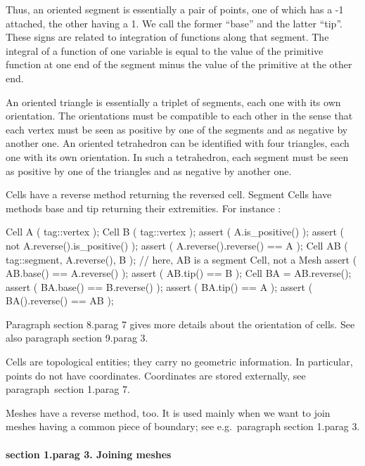 Thus, an oriented segment is essentially a pair of points, one of which has a \hbox{-1}
attached, the other having a 1.
We call the former ``base'' and the latter ``tip''.
These signs are related to integration of functions along that segment.
The integral of a function of one variable is equal to the value of the 
primitive function at one end of the segment minus the value of the primitive at the other end.

An oriented triangle is essentially a triplet of segments, each one with its own orientation.
The orientations must be compatible to each other in the sense that each vertex 
must be seen as positive by one of the segments and as negative by another one.
An oriented tetrahedron can be identified with four triangles, each one with its own
orientation.
In such a tetrahedron, each segment must be seen as positive by one of the triangles and
as negative by another one.

Cells have a {\codett reverse} method returning the reversed cell.
Segment {\codett Cell}s have methods {\codett base} and {\codett tip} returning their extremities.
For instance :

\verbatim
   Cell A ( tag::vertex );  Cell B ( tag::vertex );
   assert ( A.is_positive() );
   assert ( not A.reverse().is_positive() );
   assert ( A.reverse().reverse() == A );
   Cell AB ( tag::segment, A.reverse(), B );
   // here, AB is a segment Cell, not a Mesh
   assert ( AB.base() == A.reverse() );
   assert ( AB.tip() == B );
   Cell BA = AB.reverse();
   assert ( BA.base() == B.reverse() );
   assert ( BA.tip() == A );
   assert ( BA().reverse() == AB );
\endverbatim

Paragraph \numb section 8.\numb parag 7 gives more details about the orientation of cells.
See also paragraph \numb section 9.\numb parag 3.

Cells are topological entities; they carry no geometric information.
In particular, points do not have coordinates.
Coordinates are stored externally, see paragraph~\numb section 1.\numb parag 7.

{\codett Mesh}es have a {\codett reverse} method, too.
It is used mainly when we want to {\codett join} meshes having a common piece of boundary;
see e.g.\ paragraph \numb section 1.\numb parag 3.


\paragraph{\numb section 1.\numb parag 3. Joining meshes}

